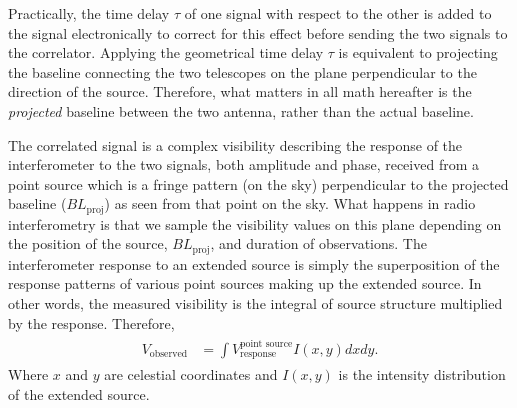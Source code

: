 \documentclass[paper=a4, fontsize=11pt]{scrartcl} %
\numberwithin{equation}{section} %
\numberwithin{figure}{section} %
\numberwithin{table}{section} %
\begin{document}
Practically, the time delay $\tau$ of one signal with respect to the other is added to the signal electronically to correct for this effect before sending the two signals to the correlator. Applying the geometrical time delay $\tau$ is equivalent to projecting the baseline connecting the two telescopes on the plane perpendicular to the direction of the source. Therefore, what matters in all math hereafter is the \emph{projected} baseline between the two antenna, rather than the actual baseline. 

The correlated signal is a complex visibility describing the response of the interferometer to the two signals, both amplitude and phase, received from a point source which is a fringe pattern (on the sky) perpendicular to the projected baseline ($BL_\mathrm{proj}$) as seen from that point on the sky. What happens in radio interferometry is that we sample the visibility values on this plane depending on the position of the source, $BL_\mathrm{proj}$, and duration of observations. The interferometer response to an extended source is simply the superposition of the response patterns of various point sources making up the extended source. In other words, the measured visibility is the integral of source structure multiplied by the response. Therefore,
\begin{align} 
\begin{split}
V_\mathrm{observed} &= \int V^\text{point source}_\text{response} I(x,y) dx dy.
\end{split}                    
\end{align}
Where $x$ and $y$ are celestial coordinates and $I(x,y)$ is the intensity distribution of the extended source.
\end{document}
